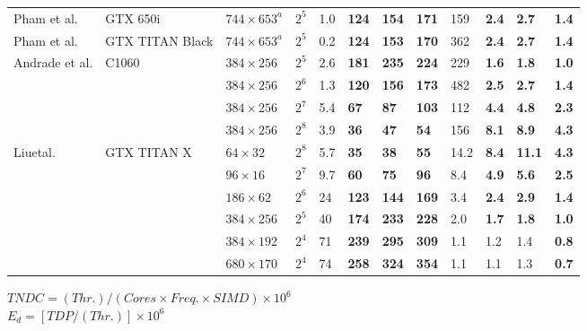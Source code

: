 \documentclass{cjc}
\begin{document}
\begin{table}[htbp]
\begin{tabular}{llllllllllll}
    Pham et al. \cite{noauthor_pham_nodate}&GTX 650i&$744{\times}653^a$&$2^5$&1.0&\textbf{124}&\textbf{154}&\textbf{171}&159&\textbf{2.4}&\textbf{2.7}&\textbf{1.4}\\
    Pham et al. \cite{noauthor_pham_nodate}&GTX TITAN Black&$744{\times}653^a$&$2^5$&0.2&\textbf{124}&\textbf{153}&\textbf{170}&362&\textbf{2.4}&\textbf{2.7}&\textbf{1.4}\\
    Andrade et al. \cite{noauthor_andrade_nodate}&C1060&$384{\times}256$&$2^5$&2.6&\textbf{181}&\textbf{235}&\textbf{224}&229&\textbf{1.6}&\textbf{1.8}&\textbf{1.0}\\
    &&$384{\times}256$&$2^6$&1.3&\textbf{120}&\textbf{156}&\textbf{173}&482&\textbf{2.5}&\textbf{2.7}&\textbf{1.4}\\
    &&$384{\times}256$&$2^7$&5.4&\textbf{67}&\textbf{87}&\textbf{103}&112&\textbf{4.4}&\textbf{4.8}&\textbf{2.3}\\
    &&$384{\times}256$&$2^8$&3.9&\textbf{36}&\textbf{47}&\textbf{54}&156&\textbf{8.1}&\textbf{8.9}&\textbf{4.3}\\
    Liuetal.\cite{liu_high-throughput_2018}&GTX TITAN X&$64{\times}32$&$2^8$&5.7&\textbf{35}&\textbf{38}&\textbf{55}&14.2&\textbf{8.4}&\textbf{11.1}&\textbf{4.3}\\
    &&$96{\times}16$&$2^7$&9.7&\textbf{60}&\textbf{75}&\textbf{96}&8.4&\textbf{4.9}&\textbf{5.6}&\textbf{2.5}\\
    &&$186{\times}62$&$2^6$&24&\textbf{123}&\textbf{144}&\textbf{169}&3.4&\textbf{2.4}&\textbf{2.9}&\textbf{1.4}\\
    &&$384{\times}256$&$2^5$&40&\textbf{174}&\textbf{233}&\textbf{228}&2.0&\textbf{1.7}&\textbf{1.8}&\textbf{1.0}\\
    &&$384{\times}192$&$2^4$&71&\textbf{239}&\textbf{295}&\textbf{309}&1.1&1.2&1.4&\textbf{0.8}\\
    &&$680{\times}170$&$2^4$&74&\textbf{258}&\textbf{324}&\textbf{354}&1.1&1.1&1.3&\textbf{0.7}\\
    \bottomrule
  \end{tabular}
  \medskip\newline
  \noindent
  $TNDC=(Thr.)/(Cores\times{Freq.}\times{SIMD})\times{10^6}$\\
  $E_d=[TDP/(Thr.)]\times10^6$
\end{table}
  
\end{document}
